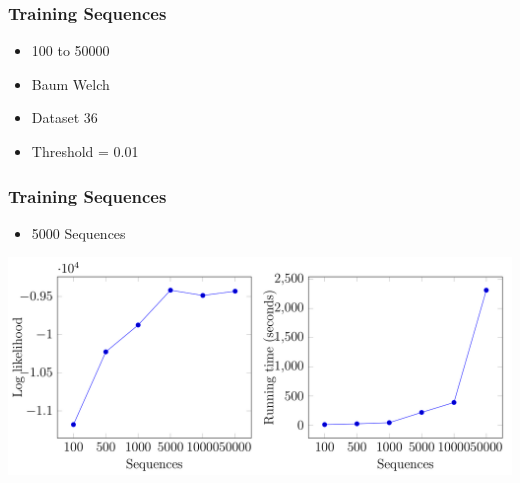 \begin{frame}
	\frametitle{Training Sequences}
		\begin{itemize}
			\item 100 to 50000
			\item Baum Welch
			\item Dataset 36
			\item Threshold = 0.01
		\end{itemize}
\end{frame}

\begin{frame}
	\frametitle{Training Sequences}
	\begin{itemize}
		\item 5000 Sequences
	\end{itemize}
	\begin{centering}
		\includegraphics[width=1\textwidth]{images/sequences.png}
	\end{centering}
\end{frame}

